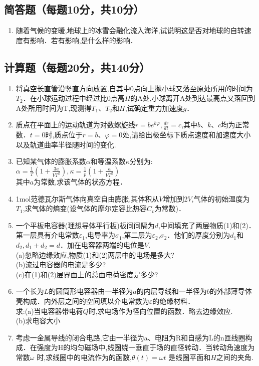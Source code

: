 
\subsection{简答题（每题10分，共10分）}
\begin{enumerate}
\item 随着气候的变暖,地球上的冰雪会融化流入海洋,试说明这是否对地球的自转速度有影响．若有影响,是什么样的影响．
\end{enumerate}
\subsection{计算题（每题20分，共140分）}
\begin{enumerate}
\item 将真空长直管沿竖直方向放置,自其中0点向上抛小球又落至原处所用的时间为$T_2$．在小球运动过程中经过比0点高$H$的$\mathrm A$处,小球离开$\mathrm A$处到达最高点又落回到$\mathrm A$处所用时间为T,现测得$T_1$、$T_2$和$H$,试确定重力加速度$g$．
\item 质点在平面上的运动轨道为对数螺旋线$r=be^{k\varphi},\frac{dr}{dt}=c$,其中$b$、$k$、$c$均为正常数．$t=0$时,质点位于$r=b$、$\varphi=0$处,请给出极坐标下质点速度和加速度大小以及轨道曲率半径随时间的变化.
\item 已知某气体的膨胀系数$\alpha$和等温系数$\kappa$分别为:\\
$\alpha=\frac{1}{T}(1+\frac{3a}{VT^2}),\kappa=\frac{1}{p}(1+\frac{a}{VT^2})$\\
其中$a$为常数,求该气体的状态方程．

\item 1mol范德瓦尔斯气体向真空自由膨胀,其体积从$V$增加到2$V$,气体的初始温度为$T_1$,求气体的熵变(设气体的摩尔定容比热容$C_v$为常数)．
\item 一个平板电容器(理想导体平行板)板间间隔为$d$,中间填充了两层物质(1)和(2)．第一层具有介电常数$\varepsilon_1$,电导率为$\sigma_1$,第二层为$\varepsilon_2$,$\sigma_2$．他们的厚度分别为$d_1$和$d_2,d_1+d_2=d$．加在电容器两端的电位是$V$.\\
(a)忽略边缘效应,物质(1)和(2)两层中的电场是多大?\\
(b)流过电容器的电流是多少?\\
(c)在(1)和(2)层界面上的总面电荷密度是多少?\\
\item 一个长为$L$的圆筒形电容器由一半径为$a$的内层导线和一半径为$b$的外部薄导体壳构成．内外层之间的空间填以介电常数为$\varepsilon$的绝缘材料．\\
求:(a)当电容器带电荷$Q$时,求电场作为径向位置的函数．略去边缘效应.\\
(b)求电容大小
\item 考虑一金属导线的闭合电路,它由一半径为a、电阻为R和自感为L的n匝线圈构成．在强度为H的均匀磁场中,线圈绕一垂直于场的直径转动．当转动角速度为常数$\omega$ 时,求线圈中的电流作为的函数,$\theta (t)=\omega t$ 是线圈平面和$H$之间的夹角.

\end{enumerate}